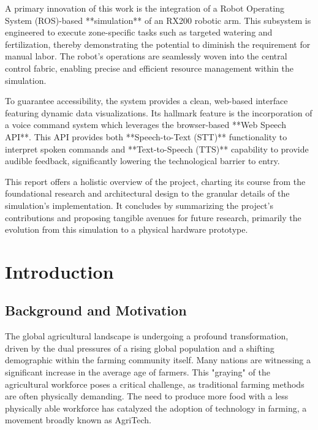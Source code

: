 \documentclass[12pt, a4paper]{report}
\begin{document}
A primary innovation of this work is the integration of a Robot Operating System (ROS)-based **simulation** of an RX200 robotic arm. This subsystem is engineered to execute zone-specific tasks such as targeted watering and fertilization, thereby demonstrating the potential to diminish the requirement for manual labor. The robot's operations are seamlessly woven into the central control fabric, enabling precise and efficient resource management within the simulation.

To guarantee accessibility, the system provides a clean, web-based interface featuring dynamic data visualizations. Its hallmark feature is the incorporation of a voice command system which leverages the browser-based **Web Speech API**. This API provides both **Speech-to-Text (STT)** functionality to interpret spoken commands and **Text-to-Speech (TTS)** capability to provide audible feedback, significantly lowering the technological barrier to entry.

This report offers a holistic overview of the project, charting its course from the foundational research and architectural design to the granular details of the simulation's implementation. It concludes by summarizing the project's contributions and proposing tangible avenues for future research, primarily the evolution from this simulation to a physical hardware prototype.

\cleardoublepage
{}
\setcounter{page}{1}

\chapter{Introduction}

\section{Background and Motivation}
The global agricultural landscape is undergoing a profound transformation, driven by the dual pressures of a rising global population and a shifting demographic within the farming community itself. Many nations are witnessing a significant increase in the average age of farmers. This "graying" of the agricultural workforce poses a critical challenge, as traditional farming methods are often physically demanding. The need to produce more food with a less physically able workforce has catalyzed the adoption of technology in farming, a movement broadly known as AgriTech.
\end{document}
